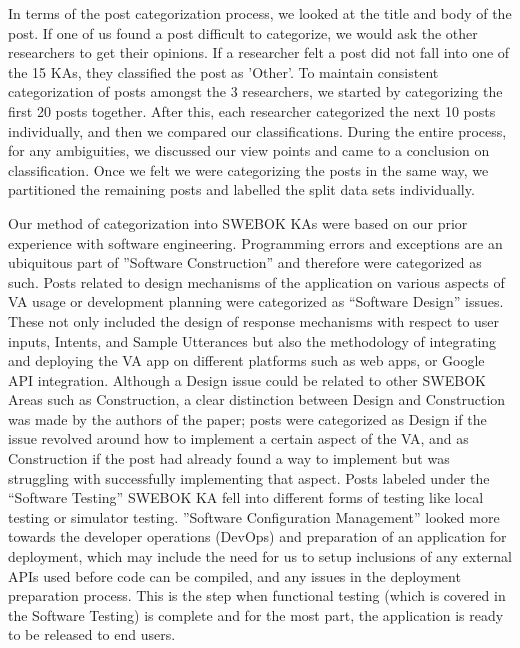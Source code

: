 \documentclass{sigchi}
\begin{document}
In terms of the post categorization process, we looked at the title and body of the post. If one of us found a post difficult to categorize, we would ask the other researchers to get their opinions. If a researcher felt a post did not fall into one of the 15 KAs, they classified the post as 'Other'. To maintain consistent categorization of posts amongst the 3 researchers, we started by categorizing the first 20 posts together. After this, each researcher categorized the next 10 posts individually, and then we compared our classifications. During the entire process, for any ambiguities, we discussed our view points and came to a conclusion on classification. Once we felt we were categorizing the posts in the same way, we partitioned the remaining posts and labelled the split data sets individually. 

Our method of categorization into SWEBOK KAs were based on our prior experience with software engineering. Programming errors and exceptions are an ubiquitous part of ''Software Construction'' and therefore were categorized as such. Posts related to design mechanisms of the application on various aspects of VA usage or development planning were categorized as ``Software Design'' issues. These not only included the design of response mechanisms with respect to user inputs, Intents, and Sample Utterances but also the methodology of integrating and deploying the VA app on different platforms such as web apps, or Google API integration. Although a Design issue could be related to other SWEBOK Areas such as Construction, a clear distinction between Design and Construction was made by the authors of the paper; posts were categorized as Design if the issue revolved around how to implement a certain aspect of the VA, and as Construction if the post had already found a way to implement but was struggling with successfully implementing that aspect. Posts labeled under the ``Software Testing'' SWEBOK KA fell into different forms of testing like local testing or simulator testing.  ''Software Configuration Management'' looked more towards the developer operations (DevOps) and preparation of an application for deployment, which may include the need for us to setup inclusions of any external APIs used before code can be compiled, and any issues in the deployment preparation process. This is the step when functional testing (which is covered in the Software Testing) is complete and for the most part, the application is ready to be released to end users.
\end{document}
